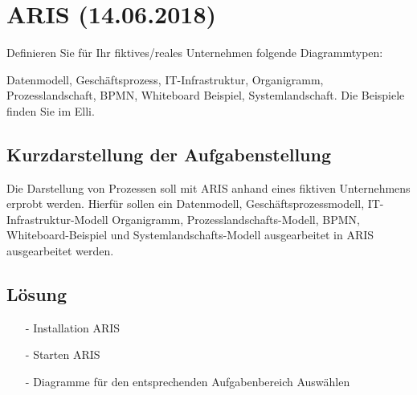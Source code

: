 \section{ARIS (14.06.2018) }
Definieren Sie für Ihr fiktives/reales Unternehmen folgende Diagrammtypen: 

Datenmodell, Geschäftsprozess, IT-Infrastruktur, Organigramm, Prozesslandschaft, BPMN, Whiteboard Beispiel, Systemlandschaft. Die Beispiele finden Sie im Elli.

\subsection*{Kurzdarstellung der Aufgabenstellung}
Die Darstellung von Prozessen soll mit ARIS anhand eines fiktiven Unternehmens erprobt werden. Hierfür sollen ein Datenmodell, Geschäftsprozessmodell, IT-Infrastruktur-Modell Organigramm, Prozesslandschafts-Modell, BPMN, Whiteboard-Beispiel und Systemlandschafts-Modell ausgearbeitet in ARIS ausgearbeitet werden.

\subsection*{Lösung}

\begin{itemize}
\item[-] Installation ARIS
\item[-] Starten ARIS
\item[-] Diagramme für den entsprechenden Aufgabenbereich Auswählen
\end{itemize}

